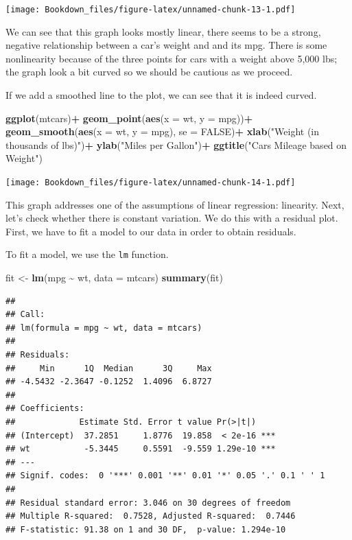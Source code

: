 \documentclass[
]{book}
\newenvironment{Shaded}{\begin{snugshade}}{\end{snugshade}}
\newcommand{\DataTypeTok}[1]{\textcolor[rgb]{0.13,0.29,0.53}{#1}}
\newcommand{\KeywordTok}[1]{\textcolor[rgb]{0.13,0.29,0.53}{\textbf{#1}}}
\newcommand{\NormalTok}[1]{#1}
\newcommand{\OperatorTok}[1]{\textcolor[rgb]{0.81,0.36,0.00}{\textbf{#1}}}
\newcommand{\OtherTok}[1]{\textcolor[rgb]{0.56,0.35,0.01}{#1}}
\newcommand{\StringTok}[1]{\textcolor[rgb]{0.31,0.60,0.02}{#1}}
\begin{document}
\texttt{[image: Bookdown\_files/figure-latex/unnamed-chunk-13-1.pdf]}

We can see that this graph looks mostly linear, there seems to be a strong, negative relationship between a car's weight and and its mpg. There is some nonlinearity because of the three points for cars with a weight above 5,000 lbs; the graph look a bit curved so we should be cautious as we proceed.

If we add a smoothed line to the plot, we can see that it is indeed curved.

\begin{Shaded}
\begin{Highlighting}[]
\KeywordTok{ggplot}\NormalTok{(mtcars)}\OperatorTok{+}
\StringTok{  }\KeywordTok{geom\_point}\NormalTok{(}\KeywordTok{aes}\NormalTok{(}\DataTypeTok{x =}\NormalTok{ wt, }\DataTypeTok{y =}\NormalTok{ mpg))}\OperatorTok{+}
\StringTok{  }\KeywordTok{geom\_smooth}\NormalTok{(}\KeywordTok{aes}\NormalTok{(}\DataTypeTok{x =}\NormalTok{ wt, }\DataTypeTok{y =}\NormalTok{ mpg), }\DataTypeTok{se =} \OtherTok{FALSE}\NormalTok{)}\OperatorTok{+}
\StringTok{  }\KeywordTok{xlab}\NormalTok{(}\StringTok{"Weight (in thousands of lbs)"}\NormalTok{)}\OperatorTok{+}
\StringTok{  }\KeywordTok{ylab}\NormalTok{(}\StringTok{"Miles per Gallon"}\NormalTok{)}\OperatorTok{+}
\StringTok{  }\KeywordTok{ggtitle}\NormalTok{(}\StringTok{"Car\textquotesingle{}s Mileage based on Weight"}\NormalTok{)}
\end{Highlighting}
\end{Shaded}

\texttt{[image: Bookdown\_files/figure-latex/unnamed-chunk-14-1.pdf]}

This graph addresses one of the assumptions of linear regression: linearity. Next, let's check whether there is constant variation. We do this with a residual plot. First, we have to fit a model to our data in order to obtain residuals.

To fit a model, we use the \texttt{lm} function.

\begin{Shaded}
\begin{Highlighting}[]
\NormalTok{fit \textless{}{-}}\StringTok{ }\KeywordTok{lm}\NormalTok{(mpg }\OperatorTok{\textasciitilde{}}\StringTok{ }\NormalTok{wt, }\DataTypeTok{data =}\NormalTok{ mtcars)}
\KeywordTok{summary}\NormalTok{(fit)}
\end{Highlighting}
\end{Shaded}

\begin{verbatim}
## 
## Call:
## lm(formula = mpg ~ wt, data = mtcars)
## 
## Residuals:
##     Min      1Q  Median      3Q     Max 
## -4.5432 -2.3647 -0.1252  1.4096  6.8727 
## 
## Coefficients:
##             Estimate Std. Error t value Pr(>|t|)    
## (Intercept)  37.2851     1.8776  19.858  < 2e-16 ***
## wt           -5.3445     0.5591  -9.559 1.29e-10 ***
## ---
## Signif. codes:  0 '***' 0.001 '**' 0.01 '*' 0.05 '.' 0.1 ' ' 1
## 
## Residual standard error: 3.046 on 30 degrees of freedom
## Multiple R-squared:  0.7528, Adjusted R-squared:  0.7446 
## F-statistic: 91.38 on 1 and 30 DF,  p-value: 1.294e-10
\end{verbatim}
\end{document}

